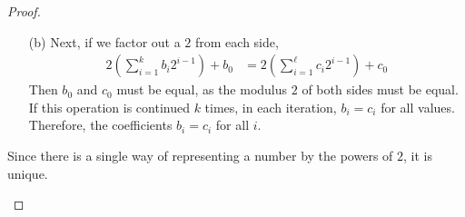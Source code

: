 \documentclass{homework}
\begin{document}
\begin{enumerate}
\begin{minipage}[t]{\linewidth}
\begin{proof}
\begin{enumerate}
\begin{enumerate}
						\item[(b)] Next, if we factor out a $2$ from each side, \begin{align*}
							 2 \left(\sum_{i = 1}^k b_i 2^{i - 1} \right) + b_0 & = 2\left(\sum_{i = 1}^\ell c_i 2^{i - 1}\right) + c_0
						\end{align*}
						Then $b_0$ and $c_0$ must be equal, as the modulus $2$ of both sides must be equal. If this operation is continued $k$ times, in each iteration, $b_i = c_i$ for all values. Therefore, the coefficients $b_i = c_i$ for all $i$.
					\end{enumerate}
					
					Since there is a single way of representing a number by the powers of $2$, it is unique.
				\end{enumerate}
			\end{proof}
		\end{minipage}
	\end{enumerate}
\end{document}
